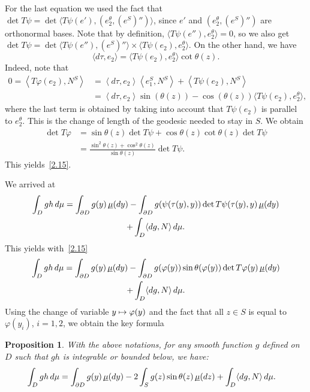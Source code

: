 \documentclass[10pt]{amsart}
\newcommand\mto{\mathchoice{\longmapsto}{\mapsto}{\mapsto}{\mapsto}}
\theoremstyle{plain}
\newtheorem{prop}[thm]{Proposition}
\theoremstyle{definition}
\newcommand{\lan}{\lt\langle}
\newcommand{\ran}{\rt\rangle}
\newcommand{\lt}{\left}
\newcommand{\rt}{\right}
\newcommand{\usm}{{\underline{\smash{\mu}}}}
\let\f\frac
\begin{document}
For the last equation we used the fact that $\det T\psi= \det \langle T\psi(e'), (e_2^\theta, (e^S)'')\rangle$, {since $e'$ and $(e_2^\theta, (e^S)'')$
are orthonormal bases. Note that by definition, $\langle T\psi(e''),e_2^\theta\rangle=0$,
so we also get $\det T\psi=\det \langle T\psi(e''), (e^S)''\rangle\times \langle T\psi(e_2), e_2^\theta\rangle$.}
On the other hand, we have
\begin{equation}
\langle d\tau,e_2\rangle =\langle T\psi (e_2), e_2^\theta\rangle \cot\theta{(z)}.
\end{equation}
{Indeed, note that
\begin{align*}
0=\lan T\varphi(e_2), N^S\ran
&=\lan d\tau, e_2\ran \lan e_1^S, N^S\ran+\lan T\psi(e_2), N^S\ran\\
&=\lan d\tau, e_2\ran \sin(\theta(z))-\cos(\theta(z))\bigl\langle T\psi(e_2), e_2^\theta\bigr\rangle,
\end{align*}
where the last term is obtained by taking into account that $ T\psi(e_2)$ is parallel to $e_2^\theta$.}
This is the change of length of the geodesic needed to stay in $S$.
We obtain
\begin{align*}
\det T\varphi&=\sin\theta(z)\det T\psi +\cos\theta(z)\cot\theta(z)\det T\psi\\
&=\f{\sin^2\theta(z)+\cos^2\theta(z)}{\sin\theta(z)}\det T\psi.
\end{align*}
This yields~\eqref{2.15}.

We arrived at
\begin{multline}
\int_Dgh\,d\mu=\int_{\partial D}g(y)\,\usm(dy)-\int_{\partial D}g(\psi(\tau(y),y))\det T\psi(\tau(y),y)\,\usm(dy)\\
+\int_D\langle dg,N\rangle \, d\mu.
\end{multline}
This yields with~\eqref{2.15}
\begin{multline}
\int_Dgh\,d\mu=\int_{\partial D}g(y)\,\usm(dy)-\int_{\partial D}g(\varphi(y))\sin\theta(\varphi(y))\det T\varphi(y)\,\usm(dy)\\
+\int_D\langle dg,N\rangle \, d\mu.
\end{multline}
Using the change of variable $y\mto\varphi(y)$ and the fact that all $z\in S$ is equal to $\varphi(y_i)$, $i=1,2$, we obtain the key formula
\begin{prop}
\label{P1}
{With the above notations, for any smooth function $g$ defined on~$D$ {such that $gh$ is integrable or bounded below}, we have:}
\begin{equation}
\begin{split}
\int_Dgh\,d\mu&=\int_{\partial D}g(y)\,\usm(dy)-2\int_{S}g(z)\sin\theta(z)\,\usm(dz)+\int_D\langle dg,N\rangle \, d\mu.
\end{split}
\end{equation}
\end{prop}
\end{document}
